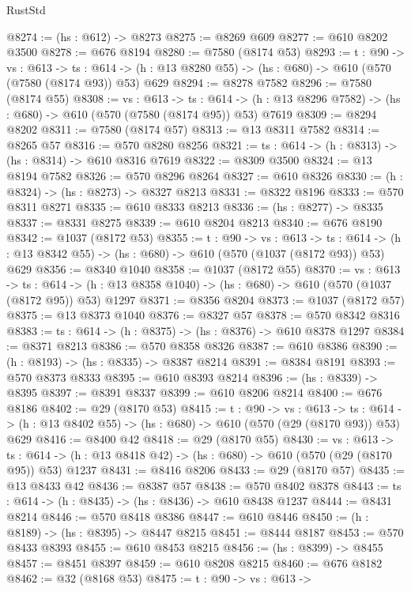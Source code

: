 \begin{lexlean}{RustStd}
\begin{coremodule}
@8274 := (hs : @612) -> @8273
@8275 := @8269 @609
@8277 := @610 @8202 @3500
@8278 := @676 @8194
@8280 := @7580 (@8174 @53)
@8293 := {t : @90} ->
  {vs : @613} ->
  {ts : @614} -> (h : @13 @8280 @55) -> (hs : @680) -> @610 (@570 (@7580 (@8174 @93)) @53) @629
@8294 := @8278 @7582
@8296 := @7580 (@8174 @55)
@8308 := {vs : @613} ->
  {ts : @614} -> (h : @13 @8296 @7582) -> (hs : @680) -> @610 (@570 (@7580 (@8174 @95)) @53) @7619
@8309 := @8294 @8202
@8311 := @7580 (@8174 @57)
@8313 := @13 @8311 @7582
@8314 := @8265 @57
@8316 := @570 @8280 @8256
@8321 := {ts : @614} -> (h : @8313) -> (hs : @8314) -> @610 @8316 @7619
@8322 := @8309 @3500
@8324 := @13 @8194 @7582
@8326 := @570 @8296 @8264
@8327 := @610 @8326
@8330 := (h : @8324) -> (hs : @8273) -> @8327 @8213
@8331 := @8322 @8196
@8333 := @570 @8311 @8271
@8335 := @610 @8333 @8213
@8336 := (hs : @8277) -> @8335
@8337 := @8331 @8275
@8339 := @610 @8204 @8213
@8340 := @676 @8190
@8342 := @1037 (@8172 @53)
@8355 := {t : @90} ->
  {vs : @613} ->
  {ts : @614} -> (h : @13 @8342 @55) -> (hs : @680) -> @610 (@570 (@1037 (@8172 @93)) @53) @629
@8356 := @8340 @1040
@8358 := @1037 (@8172 @55)
@8370 := {vs : @613} ->
  {ts : @614} -> (h : @13 @8358 @1040) -> (hs : @680) -> @610 (@570 (@1037 (@8172 @95)) @53) @1297
@8371 := @8356 @8204
@8373 := @1037 (@8172 @57)
@8375 := @13 @8373 @1040
@8376 := @8327 @57
@8378 := @570 @8342 @8316
@8383 := {ts : @614} -> (h : @8375) -> (hs : @8376) -> @610 @8378 @1297
@8384 := @8371 @8213
@8386 := @570 @8358 @8326
@8387 := @610 @8386
@8390 := (h : @8193) -> (hs : @8335) -> @8387 @8214
@8391 := @8384 @8191
@8393 := @570 @8373 @8333
@8395 := @610 @8393 @8214
@8396 := (hs : @8339) -> @8395
@8397 := @8391 @8337
@8399 := @610 @8206 @8214
@8400 := @676 @8186
@8402 := @29 (@8170 @53)
@8415 := {t : @90} ->
  {vs : @613} ->
  {ts : @614} -> (h : @13 @8402 @55) -> (hs : @680) -> @610 (@570 (@29 (@8170 @93)) @53) @629
@8416 := @8400 @42
@8418 := @29 (@8170 @55)
@8430 := {vs : @613} ->
  {ts : @614} -> (h : @13 @8418 @42) -> (hs : @680) -> @610 (@570 (@29 (@8170 @95)) @53) @1237
@8431 := @8416 @8206
@8433 := @29 (@8170 @57)
@8435 := @13 @8433 @42
@8436 := @8387 @57
@8438 := @570 @8402 @8378
@8443 := {ts : @614} -> (h : @8435) -> (hs : @8436) -> @610 @8438 @1237
@8444 := @8431 @8214
@8446 := @570 @8418 @8386
@8447 := @610 @8446
@8450 := (h : @8189) -> (hs : @8395) -> @8447 @8215
@8451 := @8444 @8187
@8453 := @570 @8433 @8393
@8455 := @610 @8453 @8215
@8456 := (hs : @8399) -> @8455
@8457 := @8451 @8397
@8459 := @610 @8208 @8215
@8460 := @676 @8182
@8462 := @32 (@8168 @53)
@8475 := {t : @90} ->
  {vs : @613} ->

\end{coremodule}
\end{lexlean}
